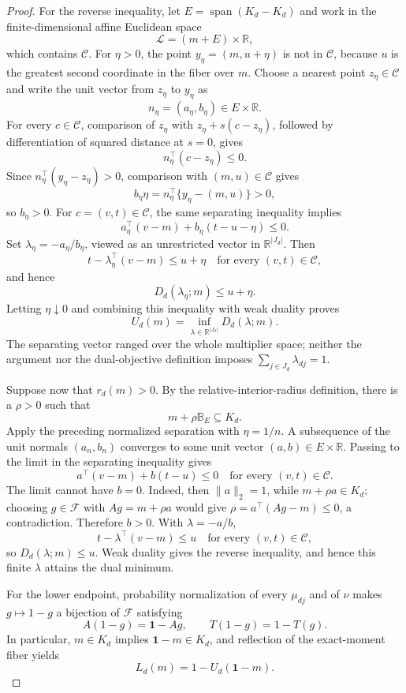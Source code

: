 \documentclass{article}
\begin{document}
\begin{proof}
For the reverse inequality, let \(E=\operatorname{span}(K_d-K_d)\) and work in the finite-dimensional affine Euclidean space
\[
 \mathcal L=(m+E)\times\mathbb R,
\]
which contains \(\mathcal C\).  For \(\eta>0\), the point \(y_\eta=(m,u+\eta)\) is not in \(\mathcal C\), because \(u\) is the greatest second coordinate in the fiber over \(m\).  Choose a nearest point \(z_\eta\in\mathcal C\) and write the unit vector from \(z_\eta\) to \(y_\eta\) as
\[
 n_\eta=(a_\eta,b_\eta)\in E\times\mathbb R.
\]
For every \(c\in\mathcal C\), comparison of \(z_\eta\) with \(z_\eta+s(c-z_\eta)\), followed by differentiation of squared distance at \(s=0\), gives
\[
 n_\eta^\top(c-z_\eta)\leq0.
\]
Since \(n_\eta^\top(y_\eta-z_\eta)>0\), comparison with \((m,u)\in\mathcal C\) gives
\[
 b_\eta\eta=n_\eta^\top\{y_\eta-(m,u)\}>0,
\]
so \(b_\eta>0\).  For \(c=(v,t)\in\mathcal C\), the same separating inequality implies
\[
 a_\eta^\top(v-m)+b_\eta(t-u-\eta)\leq0.
\]
Set \(\lambda_\eta=-a_\eta/b_\eta\), viewed as an unrestricted vector in \(\mathbb R^{\lvert J_d\rvert}\).  Then
\[
 t-\lambda_\eta^\top(v-m)\leq u+\eta
 \quad\text{for every }(v,t)\in\mathcal C,
\]
and hence
\[
 D_d(\lambda_\eta;m)\leq u+\eta.
\]
Letting \(\eta\downarrow0\) and combining this inequality with weak duality proves
\[
 U_d(m)=\inf_{\lambda\in\mathbb R^{\lvert J_d\rvert}}D_d(\lambda;m).
\]
The separating vector ranged over the whole multiplier space; neither the argument nor the dual-objective definition imposes \(\sum_{j\in J_d}\lambda_{dj}=1\).

Suppose now that \(r_d(m)>0\).  By the relative-interior-radius definition, there is a \(\rho>0\) such that
\[
 m+\rho\mathbb B_E\subseteq K_d.
\]
Apply the preceding normalized separation with \(\eta=1/n\).  A subsequence of the unit normals \((a_n,b_n)\) converges to some unit vector \((a,b)\in E\times\mathbb R\).  Passing to the limit in the separating inequality gives
\[
 a^\top(v-m)+b(t-u)\leq0
 \quad\text{for every }(v,t)\in\mathcal C.
\]
The limit cannot have \(b=0\).  Indeed, then \(\lVert a\rVert_2=1\), while \(m+\rho a\in K_d\); choosing \(g\in\mathcal F\) with \(Ag=m+\rho a\) would give \(\rho=a^\top(Ag-m)\leq0\), a contradiction.  Therefore \(b>0\).  With \(\lambda=-a/b\),
\[
 t-\lambda^\top(v-m)\leq u
 \quad\text{for every }(v,t)\in\mathcal C,
\]
so \(D_d(\lambda;m)\leq u\).  Weak duality gives the reverse inequality, and hence this finite \(\lambda\) attains the dual minimum.

For the lower endpoint, probability normalization of every \(\mu_{dj}\) and of \(\nu\) makes \(g\mapsto1-g\) a bijection of \(\mathcal F\) satisfying
\[
 A(1-g)=\mathbf 1-Ag,
 \qquad
 T(1-g)=1-T(g).
\]
In particular, \(m\in K_d\) implies \(\mathbf1-m\in K_d\), and reflection of the exact-moment fiber yields
\[
 L_d(m)=1-U_d(\mathbf1-m).
\]


\end{proof}
\end{document}
